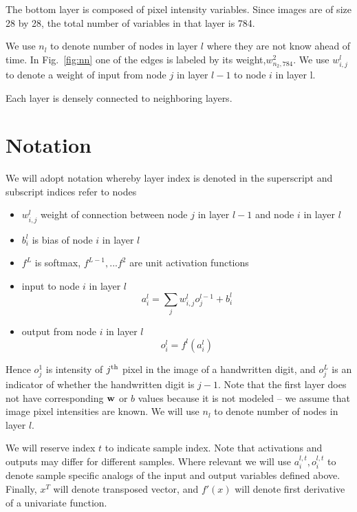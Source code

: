 \documentclass{article}
\begin{document}
The bottom layer is composed of pixel intensity variables. Since images are of size 28 by 28, the
total number of variables in that layer is 784.

We use $n_l$ to denote number of nodes in layer $l$ where they are not know ahead of time.
In Fig.~\ref{fig:nn} one of the edges is labeled by its weight,$w^2_{n_2,784}$. We use $w^l_{i,j}$ to denote a weight of
 input from node $j$ in layer $l-1$ to node $i$ in layer l.

Each layer is densely connected to neighboring layers.


\section{Notation\label{sec:notation}}
 We will adopt notation whereby layer index is denoted in the superscript and subscript indices refer to nodes
\begin{itemize}
\item $w^l_{i,j}$ weight of connection between node $j$ in layer $l-1$ and node $i$ in layer $l$
\item $b^l_i$ is bias of node $i$ in layer $l$
\item $f^L$ is softmax, $f^{L-1},... f^2$ are unit activation functions
\item input to node $i$ in layer $l$
\begin{equation}\label{eq:a}
a^l_{i} = \sum_j w^l_{i,j}o^{l-1}_{j} + b^l_i
\end{equation}
\item output from node $i$ in layer $l$
\begin{equation} \label{eq:o}
o^l_{i} = f^l(a^l_{i})
\end{equation}
\end{itemize}
Hence $o^1_{j}$ is intensity of $j^{\textrm{th}}$ pixel in the image of a handwritten digit, and $o^L_{j}$ is an indicator of whether the handwritten digit is $j-1$.
Note that the first layer does not have corresponding $\mathbf{w}$ or $b$ values because it is not modeled -- we assume that image pixel intensities are known.
We will use $n_l$ to denote number of nodes in layer $l$.

We will reserve index $t$ to indicate sample index. Note that activations and outputs may differ for different samples. Where
 relevant we will use $a^{l,t}_{i},o^{l,t}_i$ to denote sample specific analogs of the input and output variables defined above.
 Finally, $x^T$ will denote transposed vector, and $f'(x)$ will denote first derivative of a univariate function.
\end{document}
